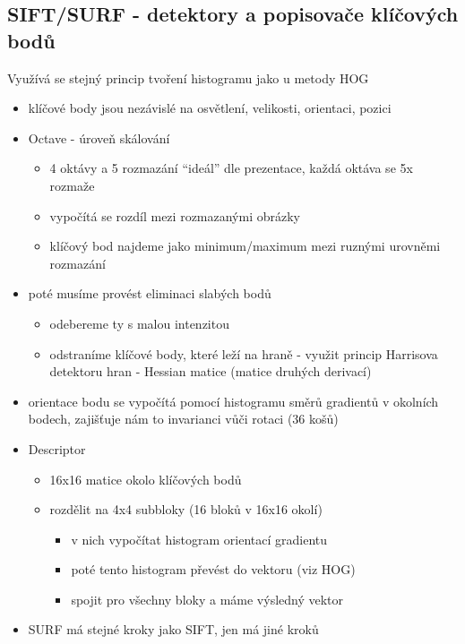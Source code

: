 \subsection{SIFT/SURF - detektory a popisovače klíčových bodů}
Využívá se stejný princip tvoření histogramu jako u metody HOG
\begin{itemize}
\item klíčové body jsou nezávislé na osvětlení, velikosti, orientaci, pozici
\item Octave - úroveň skálování
      \begin{itemize}
          \item 4 oktávy a 5 rozmazání “ideál” dle prezentace, každá oktáva se 5x rozmaže
          \item vypočítá se rozdíl mezi rozmazanými obrázky
          \item klíčový bod najdeme jako minimum/maximum mezi ruznými urovněmi rozmazání 
      \end{itemize}
  \item poté musíme provést eliminaci slabých bodů
      \begin{itemize}
          \item odebereme ty s malou intenzitou
          \item odstraníme klíčové body, které leží na hraně - využit princip Harrisova detektoru hran - Hessian matice (matice druhých derivací)
      \end{itemize}
  \item orientace bodu se vypočítá pomocí histogramu směrů gradientů v okolních bodech, zajišťuje nám to invarianci vůči rotaci (36 košů)
  \item Descriptor
      \begin{itemize}
          \item 16x16 matice okolo klíčových bodů 
          \item rozdělit na 4x4 subbloky (16 bloků v 16x16 okolí)
            \begin{itemize}
                \item v nich vypočítat histogram orientací gradientu
                \item poté tento histogram převést do vektoru (viz HOG)
                \item spojit pro všechny bloky a máme výsledný vektor
            \end{itemize}
      \end{itemize}
  \item SURF má stejné kroky jako SIFT, jen má jiné  kroků
\end{itemize}

